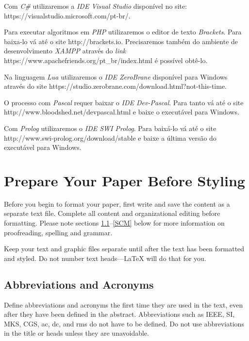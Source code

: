 \documentclass[conference]{IEEEtran}
\begin{document}
Com \textit{C\#} utilizaremos a \textit{IDE Visual Studio} disponível no site: https://visualstudio.microsoft.com/pt-br/.

Para executar algoritmos em \textit{PHP} utilizaremos o editor de texto \textit{Brackets}. Para baixa-lo vá até o site http://brackets.io. Precisaremos também do ambiente de desenvolvimento \textit{XAMPP} através do \textit{link} https://www.apachefriends.org/pt\_br/index.html é possível obtê-lo.

Na linguagem \textit{Lua} utilizaremos o \textit{IDE ZeroBrane} disponível para Windows através do site https://studio.zerobrane.com/download.html?not-this-time.

O processo com \textit{Pascal} requer baixar o \textit{IDE Dev-Pascal}. Para tanto vá até o site http://www.bloodshed.net/devpascal.html e baixe o executável para Windows.

Com \textit{Prolog} utilizaremos o \textit{IDE SWI Prolog}. Para baixá-lo vá até o site http://www.swi-prolog.org/download/stable e baixe a última versão do executável para Windows.

\section{Prepare Your Paper Before Styling}
Before you begin to format your paper, first write and save the content as a 
separate text file. Complete all content and organizational editing before 
formatting. Please note sections \ref{AA}--\ref{SCM} below for more information on 
proofreading, spelling and grammar.

Keep your text and graphic files separate until after the text has been 
formatted and styled. Do not number text heads---{\LaTeX} will do that 
for you.

\subsection{Abbreviations and Acronyms}\label{AA}
Define abbreviations and acronyms the first time they are used in the text, 
even after they have been defined in the abstract. Abbreviations such as 
IEEE, SI, MKS, CGS, ac, dc, and rms do not have to be defined. Do not use 
abbreviations in the title or heads unless they are unavoidable.
\end{document}
